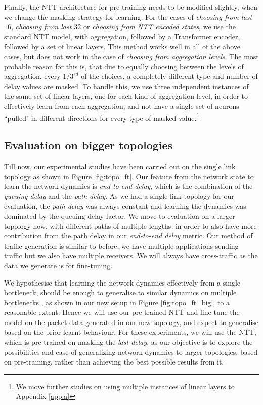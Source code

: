 Finally, the NTT architecture for pre-training needs to be modified slightly, when we change the masking strategy for learning. For the cases of \emph{choosing from last $16$}, \emph{choosing from last $32$} or \emph{choosing from NTT encoded states}, we use the standard NTT model, with aggregation, followed by a Transformer encoder, followed by a set of linear layers. This method works well in all of the above cases, but does not work in the case of \emph{choosing from aggregation levels}. The most probable reason for this is, that due to equally choosing between the levels of aggregation, every $1/3^{rd}$ of the choices, a completely different type and number of delay values are masked. To handle this, we use three independent instances of the same set of linear layers, one for each kind of aggregation level, in order to effectively learn from each aggregation, and not have a single set of neurons ``pulled" in different directions for every type of masked value.\footnote{We move further studies on using multiple instances of linear layers to Appendix \ref{app:a}}


\subsection{Evaluation on bigger topologies}
\label{ssec:comptop}

Till now, our experimental studies have been carried out on the single link topology as shown in Figure \ref{fig:topo_ft}. Our feature from the network state to learn the network dynamics is \emph{end-to-end delay}, which is the combination of the \emph{queuing delay }and the \emph{path delay}. As we had a single link topology for our evaluation, the \emph{path delay} was always constant and learning the dynamics was dominated by the queuing delay factor. We move to evaluation on a larger topology now, with different paths of multiple lengths, in order to also have more contribution from the path delay in our \emph{end-to-end delay} metric. Our method of traffic generation is similar to before, we have multiple applications sending traffic but we also have multiple receivers. We will always have cross-traffic as the data we generate is for fine-tuning.

We hypothesise that learning the network dynamics effectively from a single bottleneck, should be enough to generalise to similar dynamics on multiple bottlenecks , as shown in our new setup in Figure \ref {fig:topo_ft_big}, to a reasonable extent. Hence we will use our pre-trained NTT and fine-tune the model on the packet data generated in our new topology, and expect to generalise based on the prior learnt behaviour. For these experiments, we will use the NTT, which is pre-trained on masking the \emph{last delay}, as our objective is to explore the possibilities and ease of generalizing network dynamics to larger topologies, based on pre-training, rather than achieving the best possible results from it.

